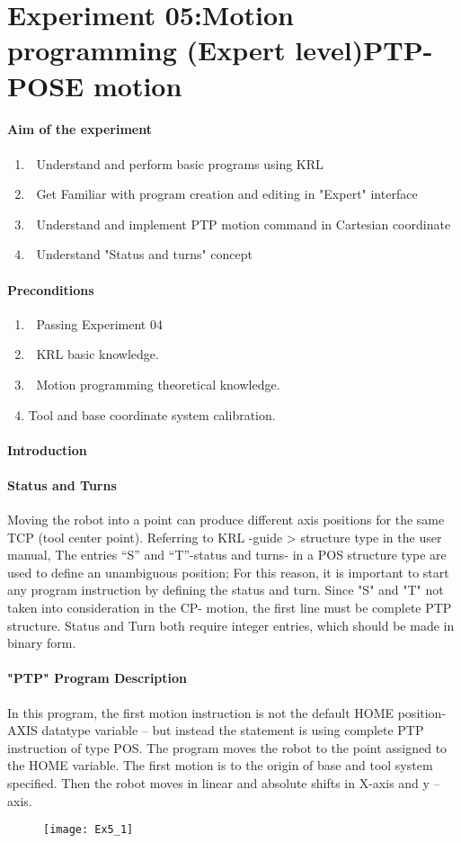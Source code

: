\documentclass[]{book}
\begin{document}
\section{Experiment 05:Motion programming (Expert level)PTP-POSE motion}
\paragraph{Aim of the experiment}
\begin{enumerate}
	\item 	Understand and perform basic programs using  KRL
	\item 	Get Familiar with program creation and editing in "Expert" interface
	\item 	Understand and implement PTP motion command in Cartesian coordinate
	\item 	Understand "Status and turns" concept
\end{enumerate}
\paragraph{Preconditions}
\begin{enumerate}
	\item 	Passing Experiment 04
	\item 	KRL basic knowledge.
	\item 	Motion programming theoretical knowledge. 
	\item Tool and base coordinate system calibration.
\end{enumerate}
\paragraph{Introduction}
\paragraph{Status and Turns}

Moving the robot into a point can produce different axis positions for the same TCP (tool center point).
Referring to KRL -guide > structure type in the user manual, The entries “S” and “T”-status and turns- in a  POS structure type are used to define an unambiguous position; For this reason, it is important to start any program instruction by defining the status and turn. Since "S" and "T" not taken into consideration in the CP- motion, the first line must be complete PTP structure.
Status and Turn both require integer entries, which should be made in binary form.
\paragraph{"PTP" Program Description}
In this program, the first motion instruction is not the default HOME position- AXIS datatype variable – but instead the statement is using complete PTP instruction of type POS.
The program moves the robot to the point assigned to the HOME variable. The first motion is to the origin of base and tool system specified. Then the robot moves in linear and absolute shifts in X-axis and y –axis.
\begin{figure}[H]
	\centering
	\texttt{[image: Ex5\_1]}
\end{figure}
\end{document}
